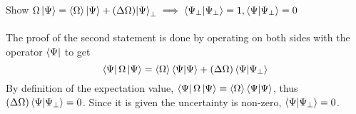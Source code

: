 \begin{sol}
Show $\Omega\ket\Psi=\langle\Omega\rangle\ket\Psi+(\Delta\Omega){\ket\Psi_\perp}\implies\braket{\Psi_\perp}{\Psi_\perp}=1,\braket{\Psi}{\Psi_\perp}=0$\\\\
The proof of the second statement is done by operating on both sides with the operator $\bra\Psi$ to get
\begin{equation}
	\bra\Psi\Omega\ket\Psi=\langle\Omega\rangle\braket{\Psi}{\Psi}+(\Delta\Omega)\braket{\Psi}{\Psi_\perp}
\end{equation}
By definition of the expectation value, $\bra\Psi\Omega\ket\Psi\equiv\langle\Omega\rangle\braket{\Psi}{\Psi}$, thus $(\Delta\Omega)\braket{\Psi}{\Psi_\perp}=0$. Since it is given the uncertainty is non-zero, $\braket{\Psi}{\Psi_\perp}=0$.

\end{sol}